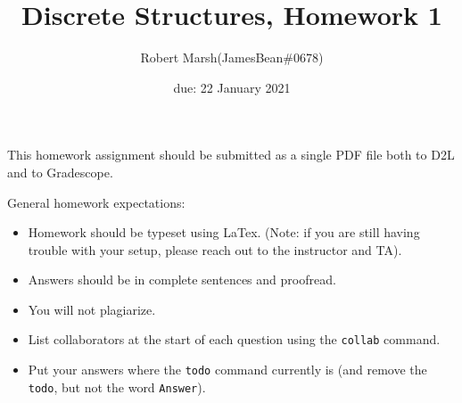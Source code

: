 \documentclass{article}
\title{Discrete Structures, Homework 1}
\author{Robert Marsh(JamesBean\#0678)}
\date{due: 22 January 2021}
\begin{document}
\maketitle

This homework assignment should be
submitted as a single PDF file both to D2L and to Gradescope.

General homework expectations:
\begin{itemize}
    \item Homework should be typeset using LaTex.  (Note: if you are still
        having trouble with your setup, please reach out to the instructor and
        TA).
    \item Answers should be in complete sentences and proofread.
    \item You will not plagiarize.
    \item List collaborators at the start of each question using the
        \texttt{collab} command.
    \item Put your answers where the \texttt{todo} command currently is (and
        remove the \texttt{todo}, but not the word \texttt{Answer}).
\end{itemize}

\clearpage

\setlength{\parindent}{10ex}
\par
\end{document}
